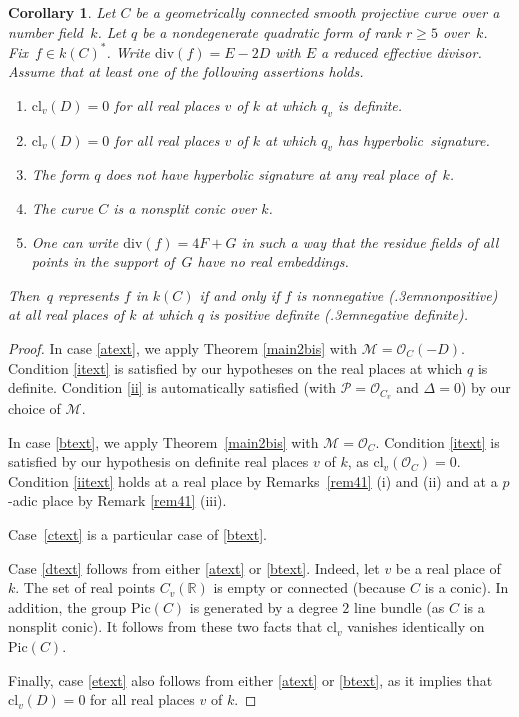 \documentclass{amsart}
\newtheorem{cor}[thm]{Corollary}
\theoremstyle{definition}
\theoremstyle{remark}
\numberwithin{equation}{section}
\newcommand{\cl}{\mathrm{cl}}
\newcommand{\Pic}{\mathrm{Pic}}
\newcommand{\ddiv}{\mathrm{div}}
\def\resp {\text{resp.}\kern.3em}
\def\R{\mathbb R}
\def\cM{\mathcal{M}}
\def\cO{\mathcal{O}}
\def\cM{\mathcal{M}}
\def\cP{\mathcal{P}}
\begin{document}
\begin{cor}
\label{coros}
Let $C$ be a geometrically connected smooth projective curve over a number field~$k$. Let $q$ be a nondegenerate quadratic form of rank $r\geq 5$ over~$k$. Fix~${f\in k(C)^*}$. Write $\ddiv(f)=E-2D$ with $E$ a reduced effective divisor. Assume that at least one of the following assertions holds.
\begin{enumerate}[label=(\alph*)] 
\item
\label{atext}
$\cl_v(D)=0$ for all real places $v$ of $k$ at which $q_v$ is definite.
\item
\label{btext}
$\cl_v(D)=0$ for all real places $v$ of $k$ at which $q_v$ 
has hyperbolic~signature.
\item 
\label{ctext}
 The form $q$ does not have hyperbolic signature at any real place of~$k$. 
 \item
  \label{dtext}
 The curve $C$ is a nonsplit conic over $k$.
 \item
 \label{etext}
One can write $\ddiv(f)=4F+G$ in such a way that the residue fields of all points in the support of~$G$ have no real embeddings.
\end{enumerate}
Then~$q$ represents $f$ in $k(C)$ if and only if $f$ is nonnegative (\resp non\-positive) at all real places of $k$ at which $q$ is positive definite (\resp negative definite).
\end{cor}

\begin{proof}
In case \ref{atext}, we apply Theorem \ref{main2bis} with $\cM=\cO_C(-D)$. Condition \ref{itext} is satisfied by our hypotheses on the real places at which $q$ is definite. Condition \ref{ii} is automatically satisfied (with $\cP=\cO_{C_v}$ and $\Delta=0$) by our choice of $\cM$.

In case \ref{btext}, we apply Theorem~\ref{main2bis} with $\cM=\cO_C$. 
Condition \ref{itext} is satisfied by our hypothesis on definite real places $v$ of $k$, as $\cl_v(\cO_C)=0$. Condition \ref{iitext} holds at a real place by Remarks~\ref{rem41} (i) and (ii) and 
at a $p$-adic place by Remark \ref{rem41} (iii).

Case~\ref{ctext} is a particular case of \ref{btext}.

Case \ref{dtext} follows from either \ref{atext} or \ref{btext}. Indeed, 
let $v$ be a real place of~$k$. The set of real points $C_v(\R)$ is empty or connected (because $C$ is a conic).  In addition, the group $\Pic(C)$ is generated by a degree $2$ line bundle (as $C$ is a nonsplit conic). It follows from these two facts that $\cl_v$ vanishes identically on $\Pic(C)$.

Finally, case \ref{etext} also follows from either \ref{atext} or \ref{btext}, as it implies that $\cl_v(D)=0$ for all real places $v$ of $k$.
\end{proof}
 
\end{document}
